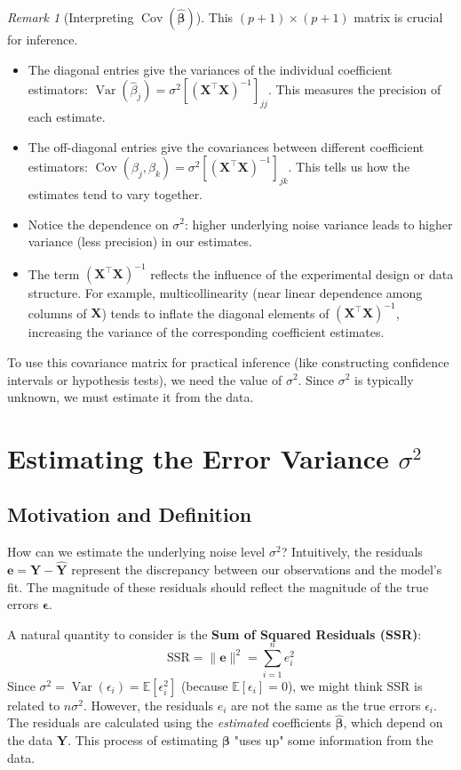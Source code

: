 \documentclass[11pt, letterpaper]{article}
\theoremstyle{definition}
\theoremstyle{plain} %
\theoremstyle{remark}
\newtheorem{remark}[definition]{Remark}     %
\newcommand{\E}{\mathbb{E}}            %
\newcommand{\Cov}{\operatorname{Cov}}  %
\newcommand{\Var}{\operatorname{Var}}  %
\newcommand{\vb}[1]{\bm{#1}}          %
\newcommand{\mb}[1]{\bm{#1}}          %
\newcommand{\Yvec}{\vb{Y}}            %
\newcommand{\Xmat}{\mb{X}}            %
\newcommand{\betavec}{\vb{\beta}}     %
\newcommand{\epsilonvec}{\vb{\epsilon}}%
\newcommand{\evec}{\vb{e}}            %
\newcommand{\Yhatvec}{\vb{\hat{Y}}}    %
\newcommand{\betahatvec}{\vb{\hat{\beta}}}%
\begin{document}
\begin{remark}[Interpreting $\Cov(\betahatvec)$]
This $(p+1) \times (p+1)$ matrix is crucial for inference.
\begin{itemize}
    \item The diagonal entries give the variances of the individual coefficient estimators: $\Var(\hat{\beta}_j) = \sigma^2 [(\Xmat^\top \Xmat)^{-1}]_{jj}$. This measures the precision of each estimate.
    \item The off-diagonal entries give the covariances between different coefficient estimators: $\Cov(\hat{\beta}_j, \hat{\beta}_k) = \sigma^2 [(\Xmat^\top \Xmat)^{-1}]_{jk}$. This tells us how the estimates tend to vary together.
    \item Notice the dependence on $\sigma^2$: higher underlying noise variance leads to higher variance (less precision) in our estimates.
    \item The term $(\Xmat^\top \Xmat)^{-1}$ reflects the influence of the experimental design or data structure. For example, multicollinearity (near linear dependence among columns of $\Xmat$) tends to inflate the diagonal elements of $(\Xmat^\top \Xmat)^{-1}$, increasing the variance of the corresponding coefficient estimates.
\end{itemize}
To use this covariance matrix for practical inference (like constructing confidence intervals or hypothesis tests), we need the value of $\sigma^2$. Since $\sigma^2$ is typically unknown, we must estimate it from the data.
\end{remark}

\section{Estimating the Error Variance \texorpdfstring{$\sigma^2$}{sigma\textasciicircum 2}}

\subsection{Motivation and Definition}

How can we estimate the underlying noise level $\sigma^2$? Intuitively, the residuals $\evec = \Yvec - \Yhatvec$ represent the discrepancy between our observations and the model's fit. The magnitude of these residuals should reflect the magnitude of the true errors $\epsilonvec$.

A natural quantity to consider is the \textbf{Sum of Squared Residuals (SSR)}:
\[
\text{SSR} = \|\evec\|^2 = \sum_{i=1}^n e_i^2
\]
Since $\sigma^2 = \Var(\epsilon_i) = \E[\epsilon_i^2]$ (because $\E[\epsilon_i]=0$), we might think SSR is related to $n\sigma^2$. However, the residuals $e_i$ are not the same as the true errors $\epsilon_i$. The residuals are calculated using the \emph{estimated} coefficients $\betahatvec$, which depend on the data $\Yvec$. This process of estimating $\betavec$ "uses up" some information from the data.
\end{document}
